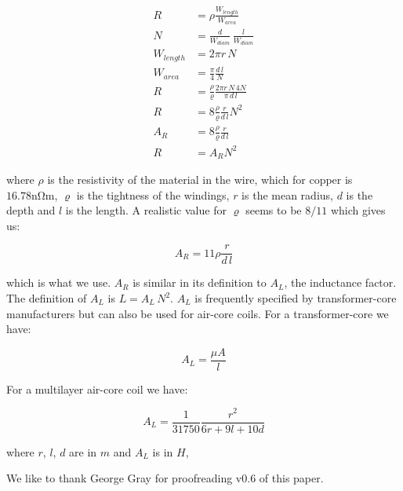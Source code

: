 \documentclass[]{../common/elementary-physics}
\begin{document}
\begin{subequations}
\begin{align}
R &= \rho \frac{W_{length}}{W_{area}} \\
N &= \frac{d}{W_{diam}} \, \frac{l}{W_{diam}} \\
W_{length} &= 2 \pi r \, N \\
W_{area} &= \frac{\pi}{4} \frac{d \, l}{N} \\
R &= \frac{\rho}{\varrho} \frac{2 \pi r \, N \, 4 N}{\pi \, d \, l} \\
R &= 8 \frac{\rho}{\varrho} \frac{r}{d \, l} N^2 \\
A_R &= 8 \frac{\rho}{\varrho} \frac{r}{d \, l} \\
R &= A_R N^2
\end{align}
\end{subequations}

where $\rho$ is the resistivity of the material in the wire, which for copper is $16.78 \si{\nano\ohm\metre}$, $\varrho$ is the tightness of the windings, $r$ is the mean radius, $d$ is the depth and $l$ is the length.
A realistic value for $\varrho$ seems to be $8/11$ which gives us:

\begin{equation}
A_R = 11 \rho \frac{r}{d \, l}
\end{equation}

which is what we use.
$A_R$ is similar in its definition to $A_L$, the inductance factor.
The definition of $A_L$ is $L = A_L \, N^2$.
$A_L$ is frequently specified by transformer-core manufacturers but can also be used for air-core coils. 
For a transformer-core we have:

\begin{equation}
A_L = \frac{\mu A}{l}
\end{equation}

For a multilayer air-core coil we have\cite{wpind}:

\begin{equation}
A_L = \frac{1}{31750} \frac{r^2}{6r+9l+10d}
\end{equation}

where $r$, $l$, $d$ are in $m$ and $A_L$ is in $H$,



We like to thank George Gray for proofreading v0.6 of this paper.

\printbibliography
\end{document}
